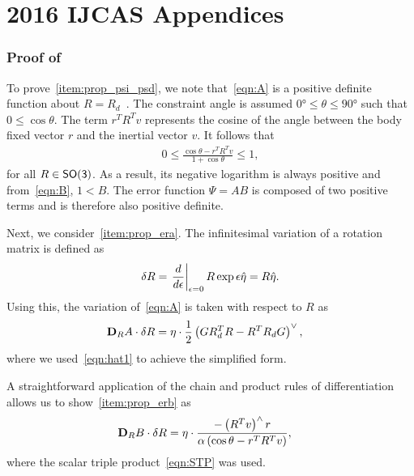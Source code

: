 \chapter{2016 IJCAS Appendices}
\subsection{Proof of~}\label{proof:config_error}
To prove~\cref{item:prop_psi_psd}, we note that~\cref{eqn:A} is a positive definite function about \( R = R_d \)~\cite{bullo2004}.
The constraint angle is assumed \( \ang{0} \leq \theta \leq \ang{90} \) such that \( 0 \leq \cos \theta \).
The term \( r^T R^T v \) represents the cosine of the angle between the body fixed vector \( r \) and the inertial vector \( v \). 
It follows that
\begin{align*}
	0 \leq  \frac{\cos \theta -  r^T R^T v}{1 + \cos \theta} \leq 1 ,
\end{align*}
for all \( R \in \mathsf{SO(3)} \). 
As a result, its negative logarithm is always positive and from~\cref{eqn:B}, \(1 < B\).
The error function \( \Psi = A B \) is composed of two positive terms and is therefore also positive definite.

Next, we consider~\cref{item:prop_era}.
The infinitesimal variation of a rotation matrix is defined as
\begin{align*}
    \delta R = \left. \frac{d }{d \epsilon} \right|_{\epsilon=0} R \exp{\epsilon \hat{\eta}} = R \hat{\eta} .
\end{align*}
Using this, the variation of~\cref{eqn:A} is taken with respect to \( R \) as
\begin{align*}
	\mathbf{D}_{R} A \cdot \delta R &= \eta \cdot \frac{1}{2} \left( G R_d^T R - R^T R_d G\right)^\vee ,
\end{align*}
where we used~\cref{eqn:hat1} to achieve the simplified form.

A straightforward application of the chain and product rules of differentiation allows us to show~\cref{item:prop_erb} as
\begin{align*}
	\mathbf{D}_{R} B \cdot \delta R &=  \eta \cdot \frac{ - \left( R^T v\right)^\wedge r}{\alpha \left(\cos \theta - r^T R^T v \right)} ,
\end{align*}
where the scalar triple product~\cref{eqn:STP} was used.

